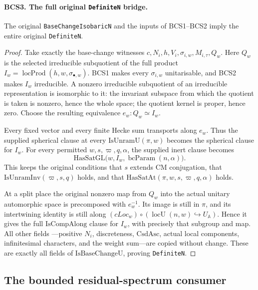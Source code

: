 \paragraph{BCS3. The full original \texttt{DefiniteN} bridge.}
\label{claim:BCS3}
The original \texttt{BaseChangeIsobaricN} and the inputs of BCS1--BCS2
imply the entire original \texttt{DefiniteN}.
\begin{proof}
Take exactly the base-change witnesses
\(c,N_i,h,V_i,\sigma_{i,w},M_{i,\tau},Q_w\).
Here \(Q_w\) is the selected irreducible subquotient of the full
product \(I_w=\operatorname{locProd}(h,w,\sigma_{\bullet,w})\).
BCS1 makes every \(\sigma_{i,w}\) unitarisable, and BCS2 makes
\(I_w\) irreducible.  A nonzero irreducible subquotient of an
irreducible representation is isomorphic to it: the invariant
subspace from which the quotient is taken is nonzero, hence the
whole space; the quotient kernel is proper, hence zero.
Choose the resulting equivalence \(e_w:Q_w\simeq I_w\).

Every fixed vector and every finite Hecke sum transports along
\(e_w\).  Thus the supplied spherical clause at every
\(\mathrm{IsUnramU}(\pi,w)\) becomes the spherical clause for
\(I_w\).  For every permitted \(w,s,\varpi,q,\alpha\), the
supplied inert clause becomes
\[
 \mathrm{HasSatGL}\bigl(w,I_w,\operatorname{bcParam}(n,\alpha)\bigr).
 \tag{BCS.6}
\]
This keeps the original conditions that \(s\) extends CM conjugation,
that \(\mathrm{IsUnramInv}(\varpi,s,q)\) holds, and that
\(\mathrm{HasSatAt}(\pi,w,s,\varpi,q,\alpha)\) holds.

At a split place the original nonzero map from \(Q_w\) into the
actual unitary automorphic space is precomposed with \(e_w^{-1}\).
Its image is still in \(\pi\), and its intertwining identity is
still along
\((cLoc_w)\circ(\operatorname{locU}(n,w)\hookrightarrow U_{\mathbb A})\).
Hence it gives the full \(\mathrm{IsCompAlong}\) clause for
\(I_w\), with precisely that subgroup and map.  All other fields
---positive \(N_i\), discreteness, \(\mathrm{CsdAsc}\), actual
local components, infinitesimal characters, and the weight sum---are
copied without change.  These are exactly all fields of
\(\mathrm{IsBaseChangeU}\), proving \texttt{DefiniteN}.
\end{proof}

\subsection{The bounded residual-spectrum consumer}

